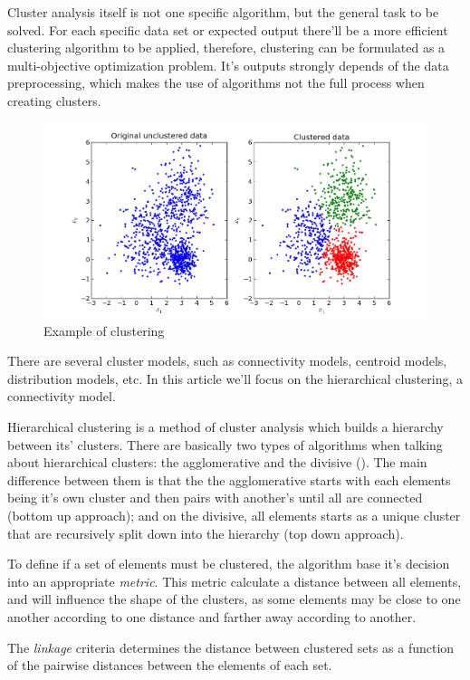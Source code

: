 \documentclass[12pt]{report}
\begin{document}
Cluster analysis itself is not one specific algorithm, but the general task to be solved. For each specific data set or expected output there'll be a more efficient clustering algorithm to be applied, therefore, clustering can be formulated as a multi-objective optimization problem. It's outputs strongly depends of the data preprocessing, which makes the use of algorithms not the full process when creating clusters.

\begin{figure}
\centering
\includegraphics[width=\textwidth]{cluster.png}
\caption{Example of clustering}
\label{fig:ex_clus}
\end{figure}

There are several cluster models, such as connectivity models, centroid models, distribution models, etc. In this article we'll focus on the hierarchical clustering, a connectivity model.

Hierarchical clustering is a method of cluster analysis which builds a hierarchy between its' clusters. There are basically two types of algorithms when talking about hierarchical clusters: the agglomerative and the divisive (\citet{rokach2005clustering}). The main difference between them is that the the agglomerative starts with each elements being it's own cluster and then pairs with another's until all are connected (bottom up approach); and on the divisive, all elements starts as a unique cluster that are recursively split down into the hierarchy (top down approach).

To define if a set of elements must be clustered, the algorithm base it's decision into an appropriate \textit{metric}. This metric calculate a distance between all elements, and will influence the shape of the clusters, as some elements may be close to one another according to one distance and farther away according to another.

The \textit{linkage} criteria determines the distance between clustered sets as a function of the pairwise distances between the elements of each set.
\end{document}
